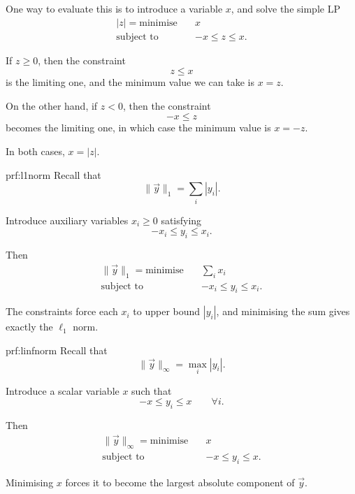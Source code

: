 One way to evaluate this is to introduce a variable \(x\), and solve the simple LP
\begin{align}
    |z|
    =
    \text{minimise} \quad   & x \label{eq:absolute-lp-1} \\
    \text{subject to} \quad &
    -x \le z \le x. \label{eq:absolute-lp-2}
\end{align}

If \(z\ge 0\), then the constraint
\[
    z\le x
\]
is the limiting one, and the minimum value we can take is \(x=z\).

On the other hand, if \(z<0\), then the constraint
\[
    -x\le z
\]
becomes the limiting one, in which case the minimum value is \(x=-z\).

In both cases, $x=|z|$.

\begin{prf}{prf:l1norm}
    Recall that
    \[
        \|\vec{y}\|_1=\sum_i |y_i|.
    \]

    Introduce auxiliary variables \(x_i\ge 0\) satisfying
    \[
        -x_i\le y_i\le x_i.
    \]

    Then
    \begin{align}
        \|\vec{y}\|_1
        =
        \text{minimise} \quad   & \sum_i x_i \\
        \text{subject to} \quad &
        -x_i\le y_i\le x_i.
    \end{align}

    The constraints force each \(x_i\) to upper bound \(|y_i|\), and minimising the sum gives exactly the \(\ell_1\) norm.
\end{prf}

\begin{prf}{prf:linfnorm}
    Recall that
    \[
        \|\vec{y}\|_\infty=\max_i |y_i|.
    \]

    Introduce a scalar variable \(x\) such that
    \[
        -x\le y_i\le x
        \qquad \forall i.
    \]

    Then
    \begin{align}
        \|\vec{y}\|_\infty
        =
        \text{minimise} \quad   & x \\
        \text{subject to} \quad &
        -x\le y_i\le x.
    \end{align}

    Minimising \(x\) forces it to become the largest absolute component of \(\vec{y}\).
\end{prf}

